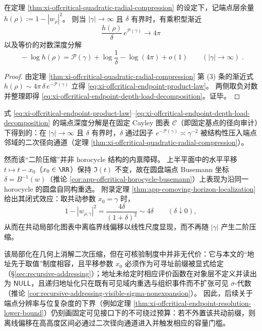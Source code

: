 \begin{corollary}\label{cor:xi-offcritical-endpoint-depth-log-decomposition}
在定理 \ref{thm:xi-offcritical-quadratic-radial-compression} 的设定下，记端点层余量
\(
h(\rho):=1-|w_\rho|^2
\)。
则当 \(|\gamma|\to\infty\) 且 \(\delta\) 有界时，有乘积型渐近
\begin{equation}\label{eq:xi-offcritical-endpoint-product-law}
\boxed{\;
\frac{h(\rho)}{\delta}\,e^{\mathcal{P}(\gamma)}\to 4\pi\;}
\end{equation}
以及等价的对数深度分解
\begin{equation}\label{eq:xi-offcritical-endpoint-depth-load-decomposition}
\boxed{\;
-\log h(\rho)=\mathcal{P}(\gamma)+\log\frac{1}{\delta}-\log(4\pi)+o(1)\qquad(|\gamma|\to\infty)\; }.
\end{equation}
\end{corollary}

\begin{proof}
由定理 \ref{thm:xi-offcritical-quadratic-radial-compression} 第 (3) 条的渐近式
\(
h(\rho)\sim 4\pi\,\delta\,e^{-\mathcal{P}(\gamma)}
\)
立得 \eqref{eq:xi-offcritical-endpoint-product-law}。
两侧取负对数并整理即得 \eqref{eq:xi-offcritical-endpoint-depth-load-decomposition}。证毕。
\end{proof}

\begin{remark}\label{rem:xi-comoving-horizon-localization-address-null}
式 \eqref{eq:xi-offcritical-endpoint-product-law}--\eqref{eq:xi-offcritical-endpoint-depth-load-decomposition} 的端点深度分解是在固定 Cayley 图表 \(\mathcal{C}\)（即固定基点的径向审计）下得到的：在 \(|\gamma|\to\infty\) 且 \(\delta\) 有界时，\(\delta\) 通过因子 \(e^{-\mathcal{P}(\gamma)}\asymp \gamma^{-2}\) 被结构性压入端点邻域的二次径向通道（定理 \ref{thm:xi-offcritical-quadratic-radial-compression}）。
\par
然而该“二阶压缩”并非 horocycle 结构的内禀障碍。
上半平面中的水平平移 \(t\mapsto t-x_0\)（\(x_0\in\RR\)）保持 \(\Im(t)\) 不变，故在圆盘端点 Busemann 坐标 \(\delta=B^{-1}(w)\)（推论 \ref{cor:app-offcritical-horocycle-busemann}）上表现为沿同一 horocycle 的圆盘自同构重选。
附录定理 \ref{thm:app-comoving-horizon-localization} 给出其闭式效应：取共动参数 \(x_0=\gamma\) 时，
\[
1-|w_{\rho,\gamma}|^2=\frac{4\delta}{(1+\delta)^2}\sim 4\delta\qquad(\delta\downarrow 0),
\]
从而在共动局部化图表中离临界线偏移以线性尺度显现，而不再随 \(|\gamma|\) 产生二阶压缩。
\par
该局部化在几何上消解二次压缩，但在可核验制度中并非无代价：它与本文的“地址先于取值”制度相容，且平移参数 \(x_0\) 必须作为可寻址前缀被显式给定（\S\ref{sec:recursive-addressing}）；地址未给定时相应评价函数在对象层不定义并读出为 \(\mathsf{NULL}\)，且递归地址化只在既有可见域内重选与组织事件而不扩张可见 \(\sigma\)-代数（推论 \ref{cor:recursive-addressing-visible-sigma-nonexpansion}）。
因此，后续关于端点分辨率与位复杂度的下界（例如定理 \ref{thm:xi-offcritical-endpoint-resolution-lower-bound}）仍刻画固定可见接口下的不可绕过预算：若不外置该共动前缀，则离线偏移在高高度区间必通过二次径向通道进入并触发相应的容量门槛。
\end{remark}

